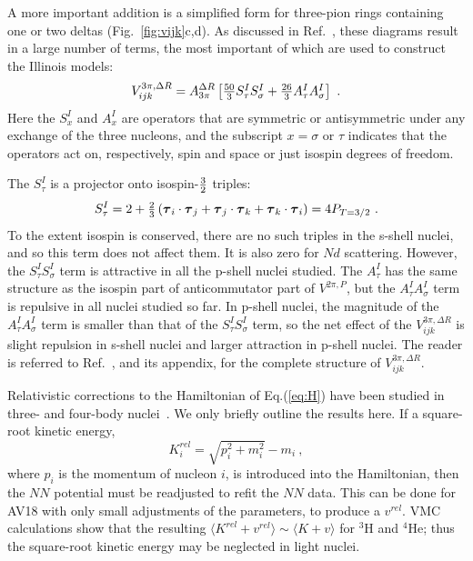 A more important addition is a simplified form for three-pion rings
containing one or two deltas (Fig.~\ref{fig:vijk}c,d).  As discussed
in Ref.~\cite{PPWC01}, these diagrams result in a large number of terms,
the most important of which are used to construct the Illinois models:
\begin{equation}
V^{3\pi,\Delta R}_{ijk} = A_{3\pi}^{\Delta R} \left[ \textstyle{50\over3}S^I_{\tau}S^I_{\sigma}+
\textstyle{26\over3}A^I_{\tau}A^I_{\sigma} \right] \ .
\end{equation}
Here the $S^I_x$ and $A^I_x$ are operators that are symmetric or antisymmetric
under any exchange of the three nucleons, and the subscript $x=\sigma$ or 
$\tau$ indicates that the operators act on, respectively, spin and space 
or just isospin degrees of freedom.

The $S^I_\tau$ is a projector onto isospin-$\textstyle{3\over2}$ triples:
\begin{equation}
S^I_{\tau} = 2 + \textstyle{2\over3}\left(\mbox{\boldmath$\tau$}_i \cdot \mbox{\boldmath$\tau$}_j 
+\mbox{\boldmath$\tau$}_j \cdot \mbox{\boldmath$\tau$}_k + \mbox{\boldmath$\tau$}_k \cdot \mbox{\boldmath$\tau$}_i \right) 
= 4 P_{T=3/2}  \ .  
\label{eq:sitau}
\end{equation}
To the extent isospin is conserved, there are no such triples in the s-shell 
nuclei, and so this term does not affect them.  It is also zero for $Nd$ 
scattering.  However, the $S^I_{\tau}S^I_{\sigma}$ term is 
attractive in all the p-shell nuclei studied.  The $A^I_\tau$ has the
same structure as the isospin part of anticommutator part of $V^{2\pi,P}$, 
but the $A^I_{\tau}A^I_{\sigma}$ term is repulsive in all nuclei studied so far.
In p-shell nuclei, the magnitude of the $A^I_{\tau}A^I_{\sigma}$ term is
smaller than that of the $S^I_{\tau}S^I_{\sigma}$ term, so the net effect
of the $V^{3\pi,\Delta R}_{ijk}$ is slight repulsion in s-shell nuclei and
larger attraction in p-shell nuclei.
The reader is referred to Ref.~\cite{PPWC01}, and its appendix, for
the complete structure of $V^{3\pi,\Delta R}_{ijk}$.

Relativistic corrections to the Hamiltonian of Eq.(\ref{eq:H}) have been
studied in three- and four-body nuclei~\cite{CPS93,FPCS95,FPA99}.  We only
briefly outline the results here.  If a square-root kinetic energy,
\begin{equation}
K^{rel}_i = \sqrt{ p^2_i + m^2_i } - m_i \ ,
\end{equation}
where $p_i$ is the momentum of nucleon $i$, is introduced into the
Hamiltonian, then the $N\!N$ potential must be readjusted to
refit the $N\!N$ data.  This can be done for AV18 with only small 
adjustments of the parameters, to produce a $v^{rel}$.  VMC calculations show 
that the resulting $\langle K^{rel}+v^{rel} \rangle \sim \langle K+v \rangle$
for $^3$H and $^4$He; thus the square-root kinetic energy
may be neglected in light nuclei.

